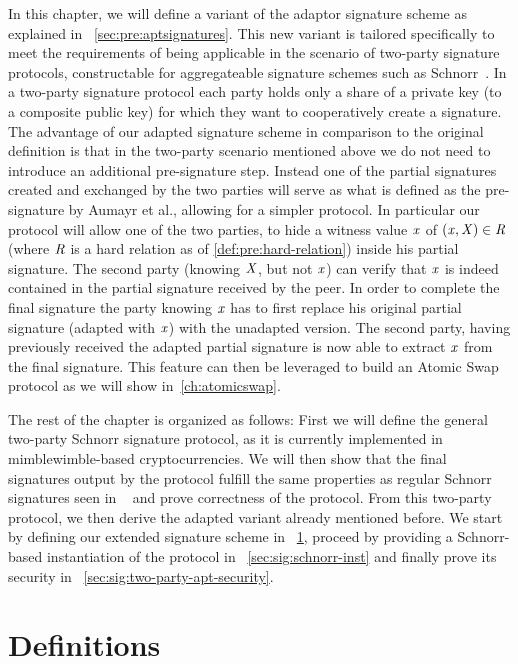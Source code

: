 In this chapter, we will define a variant of the adaptor signature scheme as explained in ~\cref{sec:pre:aptsignatures}.
This new variant is tailored specifically to meet the requirements of being applicable in the scenario of two-party signature protocols, constructable for aggregateable signature schemes such as Schnorr~\cite{maxwell2019simple}.
In a two-party signature protocol each party holds only a share of a private key (to a composite public key) for which they want to cooperatively create a signature.
The advantage of our adapted signature scheme in comparison to the original definition is that in the two-party scenario mentioned above we do not need to introduce an additional pre-signature step.
Instead one of the partial signatures created and exchanged by the two parties will serve as what is defined as the pre-signature by Aumayr et al., allowing for a simpler protocol.
In particular our protocol will allow one of the two parties, to hide a witness value $\mathit{x}$ of $(\mathit{x}, \mathit{X}) \in \mathit{R}$ (where $\mathit{R}$ is a hard relation as of \cref{def:pre:hard-relation}) inside his partial signature.
The second party (knowing $\mathit{X}$, but not $\mathit{x}$) can verify that $\mathit{x}$ is indeed contained in the partial signature received by the peer.
In order to complete the final signature the party knowing $\mathit{x}$ has to first replace his original partial signature (adapted with $\mathit{x}$) with the unadapted version.
The second party, having previously received the adapted partial signature is now able to extract $\mathit{x}$ from the final signature.
This feature can then be leveraged to build an Atomic Swap protocol as we will show in~\cref{ch:atomicswap}.

The rest of the chapter is organized as follows:
First we will define the general two-party Schnorr signature protocol, as it is currently implemented in mimblewimble-based cryptocurrencies.
We will then show that the final signatures output by the protocol fulfill the same properties as regular Schnorr signatures seen in ~\cite{schnorr1989efficient} and prove correctness of the protocol.
From this two-party protocol, we then derive the adapted variant already mentioned before.
We start by defining our extended signature scheme in ~\cref{sec:sig:definitions}, proceed by providing a Schnorr-based instantiation of the protocol in ~\cref{sec:sig:schnorr-inst} and finally prove its security in ~\cref{sec:sig:two-party-apt-security}.

\section{Definitions} \label{sec:sig:definitions}


